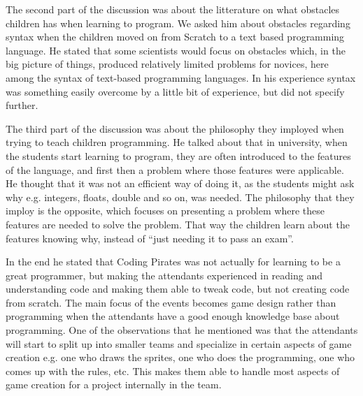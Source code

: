 The second part of the discussion was about the litterature on what obstacles children has when learning to program. We asked him about obstacles regarding syntax when the children moved on from Scratch to a text based programming language. He stated that some scientists would focus on obstacles which, in the big picture of things, produced relatively limited problems for novices, here among the syntax of text-based programming languages. In his experience syntax was something easily overcome by a little bit of experience, but did not specify further.

The third part of the discussion was about the philosophy they imployed when trying to teach children programming. He talked about that in university, when the students start learning to program, they are often introduced to the features of the language, and first then a problem where those features were applicable. He thought that it was not an efficient way of doing it, as the students might ask why e.g. integers, floats, double and so on, was needed. The philosophy that they imploy is the opposite, which focuses on presenting a problem where these features are needed to solve the problem. That way the children learn about the features knowing why, instead of ``just needing it to pass an exam''.

In the end he stated that Coding Pirates was not actually for learning to be a great programmer, but making the attendants experienced in reading and understanding code and making them able to tweak code, but not creating code from scratch. The main focus of the events becomes game design rather than programming when the attendants have a good enough knowledge base about programming. One of the observations that he mentioned was that the attendants will start to split up into smaller teams and specialize in certain aspects of game creation e.g. one who draws the sprites, one who does the programming, one who comes up with the rules, etc. This makes them able to handle most aspects of game creation for a project internally in the team.